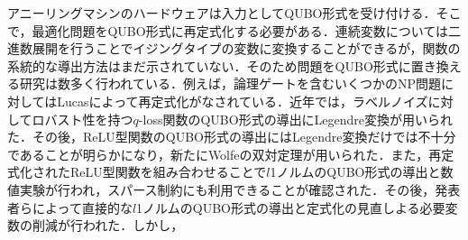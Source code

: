 \documentclass[technicalreport]{ieicej}
\begin{document}
アニーリングマシンのハードウェアは入力としてQUBO形式を受け付ける．そこで，最適化問題をQUBO形式に再定式化する必要がある．連続変数については二進数展開を行うことでイジングタイプの変数に変換することができるが，関数の系統的な導出方法はまだ示されていない．そのため問題をQUBO形式に置き換える研究は数多く行われている．例えば，論理ゲートを含むいくつかのNP問題に対してはLucasによって再定式化がなされている\cite{logic_gate,formulation}．近年では，ラベルノイズに対してロバスト性を持つ$q$-loss関数のQUBO形式の導出にLegendre変換が用いられた\cite{q-loss_formulation}．その後，ReLU型関数のQUBO形式の導出\cite{ReLU_function}にはLegendre変換だけでは不十分であることが明らかになり，新たにWolfeの双対定理\cite{Wolfe_duality}が用いられた．また，再定式化されたReLU型関数を組み合わせることで$l$1ノルムのQUBO形式の導出と数値実験が行われ，スパース制約にも利用できることが確認された\cite{ReLU_simmulate}．その後，発表者らによって直接的な$l$1ノルムのQUBO形式の導出と定式化の見直しよる必要変数の削減が行われた．しかし，


%
%
\begin{thebibliography}{99}%
\bibitem{}
\end{thebibliography}
\end{document}
